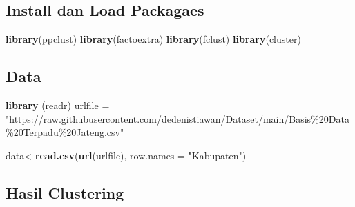 \documentclass[
]{elegantbook}
\newenvironment{Shaded}{\begin{snugshade}}{\end{snugshade}}
\newcommand{\AttributeTok}[1]{\textcolor[rgb]{0.13,0.29,0.53}{#1}}
\newcommand{\DecValTok}[1]{\textcolor[rgb]{0.00,0.00,0.81}{#1}}
\newcommand{\FunctionTok}[1]{\textcolor[rgb]{0.13,0.29,0.53}{\textbf{#1}}}
\newcommand{\NormalTok}[1]{#1}
\newcommand{\OtherTok}[1]{\textcolor[rgb]{0.56,0.35,0.01}{#1}}
\newcommand{\SpecialCharTok}[1]{\textcolor[rgb]{0.81,0.36,0.00}{\textbf{#1}}}
\newcommand{\StringTok}[1]{\textcolor[rgb]{0.31,0.60,0.02}{#1}}
\begin{document}
\hypertarget{install-dan-load-packagaes}{%
\subsection{Install dan Load Packagaes}\label{install-dan-load-packagaes}}

\begin{Shaded}
\begin{Highlighting}[]
\FunctionTok{library}\NormalTok{(ppclust)}
\FunctionTok{library}\NormalTok{(factoextra)}
\FunctionTok{library}\NormalTok{(fclust)}
\FunctionTok{library}\NormalTok{(cluster)}
\end{Highlighting}
\end{Shaded}

\hypertarget{data-1}{%
\subsection{Data}\label{data-1}}

\begin{Shaded}
\begin{Highlighting}[]
\FunctionTok{library}\NormalTok{ (readr)}
\NormalTok{urlfile }\OtherTok{=} \StringTok{"https://raw.githubusercontent.com/dedenistiawan/Dataset/main/Basis\%20Data\%20Terpadu\%20Jateng.csv"}

\NormalTok{data}\OtherTok{\textless{}{-}}\FunctionTok{read.csv}\NormalTok{(}\FunctionTok{url}\NormalTok{(urlfile), }\AttributeTok{row.names =} \StringTok{"Kabupaten"}\NormalTok{)}
\end{Highlighting}
\end{Shaded}

\hypertarget{hasil-clustering}{%
\subsection{Hasil Clustering}\label{hasil-clustering}}

\begin{Shaded}
\end{Shaded}
\end{document}
